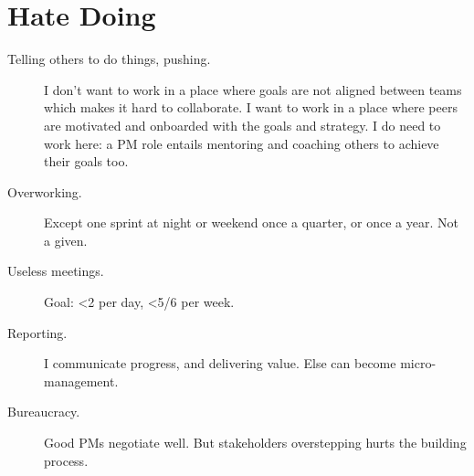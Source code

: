 \documentclass[10pt, a4paper, twocolumn]{article}
\begin{document}
%
%
%

\vfill\eject

\section*{Hate Doing}

\begin{description}
 \item[Telling others to do things, pushing.]
I don't want to work in a place where goals are not aligned between teams which makes it hard to collaborate. I want to work in a place where peers are motivated and onboarded with the goals and strategy.
I do need to work here: a PM role entails mentoring and coaching others to achieve their goals too.
 \item[Overworking.] Except one sprint at night or weekend once a quarter, or once a year.
 Not a given.
 \item[Useless meetings.] Goal: <2 per day,  <5/6 per week. %
 \item[Reporting.]
 I communicate progress, %
 and delivering value. %
 Else can become micro-management.
  \item[Bureaucracy.] Good PMs negotiate well.
  But stakeholders overstepping hurts the building process.
\end{description}
\end{document}
